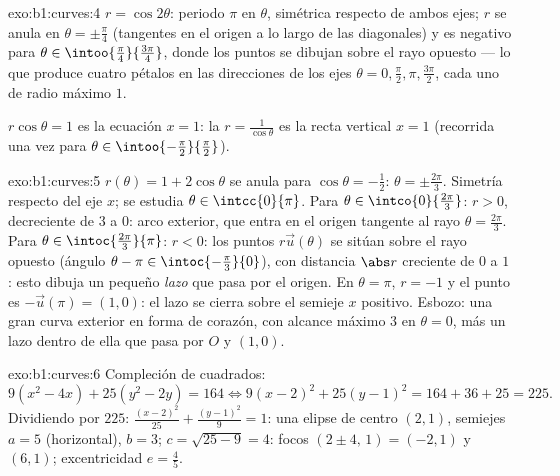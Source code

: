 \begin{solution}{exo:b1:curves:4}
$r = \cos 2\theta$: periodo $\pi$ en $\theta$, simétrica respecto de ambos
ejes; $r$ se anula en $\theta = \pm\frac\pi4$ (tangentes en el
origen a lo largo de las diagonales) y es negativo para $\theta \in
\intoo{\frac\pi4}{\frac{3\pi}{4}}$, donde los puntos se dibujan sobre el
rayo opuesto --- lo que produce cuatro pétalos en las direcciones de los ejes
$\theta = 0, \frac\pi2, \pi, \frac{3\pi}{2}$, cada uno de radio
máximo $1$.

$r\cos\theta = 1$ es la ecuación $x = 1$: la  $r =
\frac{1}{\cos\theta}$ es la recta vertical $x = 1$ (recorrida una vez para
$\theta \in \intoo{-\frac\pi2}{\frac\pi2}$).
\end{solution}

\begin{solution}{exo:b1:curves:5}
$r(\theta) = 1 + 2\cos\theta$ se anula para $\cos\theta = -\frac12$:
$\theta = \pm\frac{2\pi}{3}$. Simetría respecto del eje $x$; se estudia
$\theta \in \intcc{0}{\pi}$. Para $\theta \in
\intco{0}{\frac{2\pi}{3}}$: $r > 0$, decreciente de $3$ a $0$:
arco exterior, que entra en el origen tangente al rayo $\theta =
\frac{2\pi}{3}$. Para $\theta \in \intoc{\frac{2\pi}{3}}{\pi}$: $r <
0$: los puntos $r\vec u(\theta)$ se sitúan sobre el rayo opuesto (ángulo
$\theta - \pi \in \intoc{-\frac\pi3}{0}$), con distancia $\abs r$
creciente de $0$ a $1$: esto dibuja un pequeño \emph{lazo }
que pasa por el origen. En $\theta = \pi$, $r = -1$ y el punto es
$-\vec u(\pi) = (1, 0)$: el lazo se cierra sobre el semieje $x$ positivo.
Esbozo: una gran curva exterior en forma de corazón,
con alcance máximo $3$ en $\theta = 0$, más un lazo dentro de ella
que pasa por $O$ y $(1,0)$.
\end{solution}

\begin{solution}{exo:b1:curves:6}
Compleción de cuadrados:
\[
9(x^2 - 4x) + 25(y^2 - 2y) = 164
\iff 9(x-2)^2 + 25(y-1)^2 = 164 + 36 + 25 = 225 .
\]
Dividiendo por $225$: $\frac{(x-2)^2}{25} + \frac{(y-1)^2}{9} = 1$: una
elipse de centro $(2, 1)$, semiejes $a = 5$ (horizontal), $b =
3$; $c = \sqrt{25 - 9} = 4$: focos $(2 \pm 4,\, 1) = (-2, 1)$ y
$(6, 1)$; excentricidad $e = \frac45$.
\end{solution}

